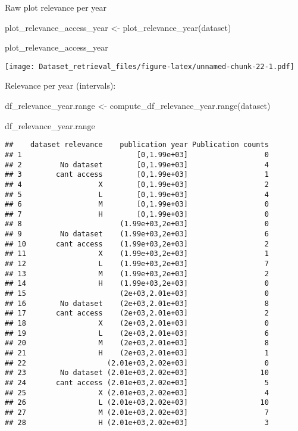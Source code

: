 \documentclass[
]{article}
\newenvironment{Shaded}{\begin{snugshade}}{\end{snugshade}}
\newcommand{\FunctionTok}[1]{\textcolor[rgb]{0.00,0.00,0.00}{#1}}
\newcommand{\NormalTok}[1]{#1}
\newcommand{\OtherTok}[1]{\textcolor[rgb]{0.56,0.35,0.01}{#1}}
\begin{document}
Raw plot relevance per year

\begin{Shaded}
\begin{Highlighting}[]
\NormalTok{plot\_relevance\_access\_year }\OtherTok{\textless{}{-}} \FunctionTok{plot\_relevance\_year}\NormalTok{(dataset)}

\NormalTok{plot\_relevance\_access\_year}
\end{Highlighting}
\end{Shaded}

\texttt{[image: Dataset\_retrieval\_files/figure-latex/unnamed-chunk-22-1.pdf]}

Relevance per year (intervals):

\begin{Shaded}
\begin{Highlighting}[]
\NormalTok{df\_relevance\_year.range }\OtherTok{\textless{}{-}} \FunctionTok{compute\_df\_relevance\_year.range}\NormalTok{(dataset)}

\NormalTok{df\_relevance\_year.range}
\end{Highlighting}
\end{Shaded}

\begin{verbatim}
##    dataset relevance    publication year Publication counts
## 1                           [0,1.99e+03]                  0
## 2         No dataset        [0,1.99e+03]                  4
## 3        cant access        [0,1.99e+03]                  1
## 4                  X        [0,1.99e+03]                  2
## 5                  L        [0,1.99e+03]                  4
## 6                  M        [0,1.99e+03]                  0
## 7                  H        [0,1.99e+03]                  0
## 8                       (1.99e+03,2e+03]                  0
## 9         No dataset    (1.99e+03,2e+03]                  6
## 10       cant access    (1.99e+03,2e+03]                  2
## 11                 X    (1.99e+03,2e+03]                  1
## 12                 L    (1.99e+03,2e+03]                  7
## 13                 M    (1.99e+03,2e+03]                  2
## 14                 H    (1.99e+03,2e+03]                  0
## 15                      (2e+03,2.01e+03]                  0
## 16        No dataset    (2e+03,2.01e+03]                  8
## 17       cant access    (2e+03,2.01e+03]                  2
## 18                 X    (2e+03,2.01e+03]                  0
## 19                 L    (2e+03,2.01e+03]                  6
## 20                 M    (2e+03,2.01e+03]                  8
## 21                 H    (2e+03,2.01e+03]                  1
## 22                   (2.01e+03,2.02e+03]                  0
## 23        No dataset (2.01e+03,2.02e+03]                 10
## 24       cant access (2.01e+03,2.02e+03]                  5
## 25                 X (2.01e+03,2.02e+03]                  4
## 26                 L (2.01e+03,2.02e+03]                 10
## 27                 M (2.01e+03,2.02e+03]                  7
## 28                 H (2.01e+03,2.02e+03]                  3
\end{verbatim}
\end{document}
